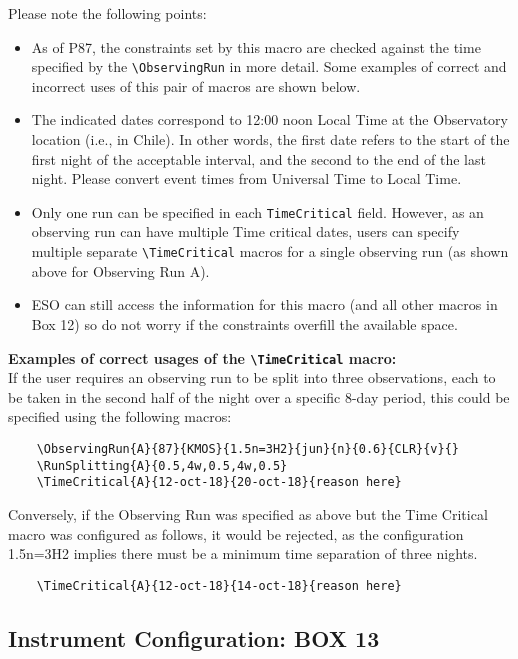 \documentclass{article}
\begin{document}
Please note the following points:
\begin{itemize}
\item As of P87, the constraints set by this macro are checked against the
  time specified by the \verb|\ObservingRun| in more detail.
  Some examples of correct and incorrect uses of this pair of macros are shown below.
\item The indicated dates correspond to 12:00 noon Local Time at
  the Observatory location (i.e., in Chile). In other words, the first
  date refers to the start of the first night of the acceptable
  interval, and the second to the end of the last night. Please 
  convert event times from Universal Time to Local Time.
\item Only one run can be specified in each \verb|TimeCritical| field. 
  However, as an observing run can have multiple Time critical dates, users
  can specify multiple separate \verb|\TimeCritical| macros for a single observing run (as   
  shown above for Observing Run A).
\item ESO can still access the information for this macro (and all other macros in Box 12)   
  so do not worry if the constraints overfill the available space.
\end{itemize}

{\bf Examples of correct usages of the \verb|\TimeCritical| macro: }\\
If the user requires an observing run to be split into three observations, each to be taken in the 
second half of the night over a specific 8-day period, this could be specified using the following macros:
\begin{verbatim}
    \ObservingRun{A}{87}{KMOS}{1.5n=3H2}{jun}{n}{0.6}{CLR}{v}{}
    \RunSplitting{A}{0.5,4w,0.5,4w,0.5}
    \TimeCritical{A}{12-oct-18}{20-oct-18}{reason here}
\end{verbatim}

Conversely, if the Observing Run was specified as above but the Time Critical macro was configured as follows,
it would be rejected, as the configuration 1.5n=3H2 implies there must be a minimum time separation of three nights.
\begin{verbatim}
    \TimeCritical{A}{12-oct-18}{14-oct-18}{reason here}
\end{verbatim}

\subsection{Instrument Configuration: {\bf BOX 13}}
\end{document}
